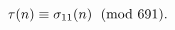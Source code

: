\[\mathop{\tau\/}\nolimits\!\left(n\right)\equiv\mathop{\sigma_{11}\/}\nolimits%
\!\left(n\right)\pmod{691}.\]